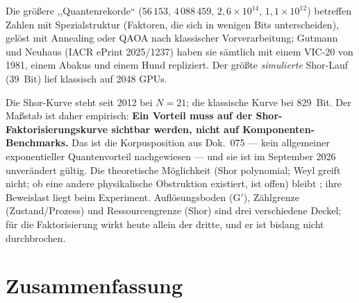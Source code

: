 Die größere ,,Quantenrekorde`` ($56\,153$, $4\,088\,459$, $2{,}6\times10^{14}$,
$1{,}1\times10^{12}$) betreffen Zahlen mit Spezialstruktur (Faktoren, die sich
in wenigen Bits unterscheiden), gelöst mit Annealing oder QAOA nach klassischer
Vorverarbeitung; Gutmann und Neuhaus (IACR ePrint 2025/1237) haben sie
sämtlich mit einem VIC-20 von 1981, einem Abakus und einem Hund repliziert.
Der größte \emph{simulierte} Shor-Lauf (39~Bit) lief klassisch auf 2048 GPUs.

Die Shor-Kurve steht seit 2012 bei $N=21$; die klassische Kurve bei 829~Bit.
Der Maßstab ist daher empirisch: \textbf{Ein Vorteil muss auf der
Shor-Faktorisierungskurve sichtbar werden, nicht auf Komponenten-Benchmarks.}
Das ist die Korpusposition aus Dok.~075 --- kein allgemeiner
exponentieller Quantenvorteil nachgewiesen --- und sie ist im September 2026
unverändert gültig. Die theoretische Möglichkeit (Shor polynomial; Weyl greift nicht; ob eine
andere physikalische Obstruktion existiert, ist offen) bleibt \SM;
ihre Beweislast liegt beim Experiment.
Auflösungsboden (G$'$), Zählgrenze (Zustand/Prozess) und Ressourcengrenze
(Shor) sind drei verschiedene Deckel; für die Faktorisierung wirkt heute
allein der dritte, und er ist bislang nicht durchbrochen.


\section{Zusammenfassung}

